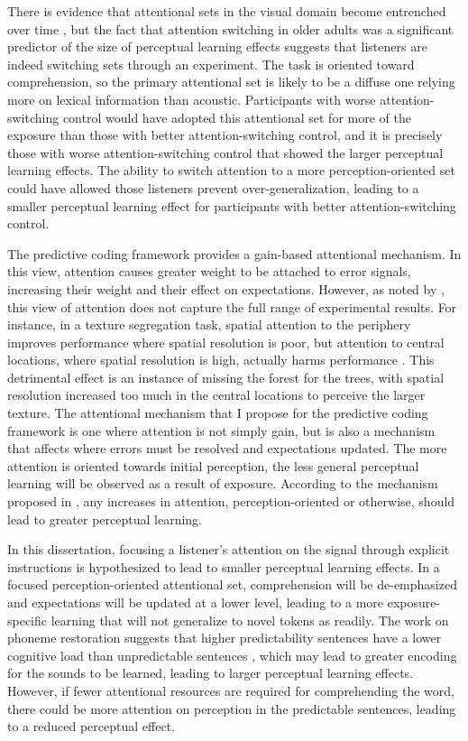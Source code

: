 There is evidence that attentional sets in the visual domain become entrenched over time \cite{Leber2006}, but the fact that attention switching in older adults was a significant predictor of the size of perceptual learning effects \citep{Scharenborg2014} suggests that listeners are indeed switching sets through an experiment.
The task is oriented toward comprehension, so the primary attentional set is likely to be a diffuse one relying more on lexical information than acoustic.
Participants with worse attention-switching control would have adopted this attentional set for more of the exposure than those with better attention-switching control, and it is precisely those with worse attention-switching control that showed the larger perceptual learning effects.
The ability to switch attention to a more perception-oriented set could have allowed those listeners prevent over-generalization, leading to a smaller perceptual learning effect for participants with better attention-switching control. 

The predictive coding framework \citep{Clark2013} provides a gain-based attentional mechanism. 
In this view, attention causes greater weight to be attached to error signals, increasing their weight and their effect on expectations.  
However, as noted by \citet{Block2013}, this view of attention does not capture the full range of experimental results.  
For instance, in a texture segregation task, spatial attention to the periphery improves performance where spatial resolution is poor, but attention to central locations, where spatial resolution is high, actually harms performance \citep{Yeshurun1998}.  
This detrimental effect is an instance of missing the forest for the trees, with spatial resolution increased too much in the central locations to perceive the larger texture.  
The attentional mechanism that I propose for the predictive coding framework is one where attention is not simply gain, but is also a mechanism that affects where errors must be resolved and expectations updated.  
The more attention is oriented towards initial perception, the less general perceptual learning will be observed as a result of exposure.  
According to the mechanism proposed in \citet{Clark2013}, any increases in attention, perception-oriented or otherwise, should lead to greater perceptual learning.

In this dissertation, focusing a listener's attention on the signal through explicit instructions is hypothesized to lead to smaller perceptual learning effects.
In a focused perception-oriented attentional set, comprehension will be de-emphasized and expectations will be updated at a lower level, leading to a more exposure-specific learning that will not generalize to novel tokens as readily.
The work on phoneme restoration suggests that higher predictability sentences have a lower cognitive load than unpredictable sentences \citep{Samuel1981}, which may lead to greater encoding for the sounds to be learned, leading to larger perceptual learning effects.
However, if fewer attentional resources are required for comprehending the word, there could be more attention on perception in the predictable sentences, leading to a reduced perceptual effect.

